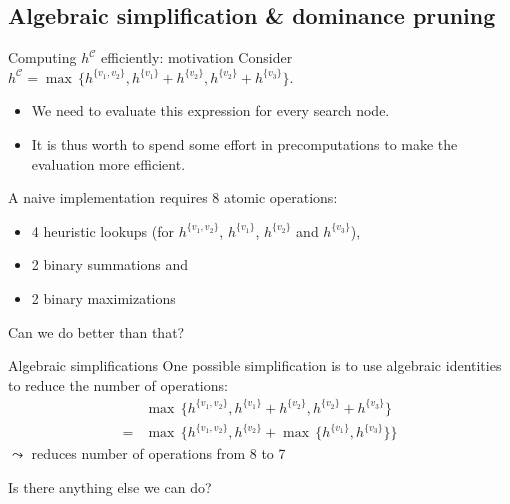 \documentclass{gkibeamer}
\begin{document}
\subsection[Simplification]{Algebraic simplification \& dominance pruning}

\begin{frame}{Computing $h^{\mathcal C}$ efficiently: motivation}
  Consider $h^{\mathcal C} = \max\,\{
    h^{\{v_1, v_2\}},
    h^{\{v_1\}} + h^{\{v_2\}},
    h^{\{v_2\}} + h^{\{v_3\}}
    \}$.
  \begin{itemize}
  \item We need to evaluate this expression for \alert{every search
    node}.
  \item It is thus worth to spend some effort in precomputations to
    make the evaluation \alert{more efficient}.
  \end{itemize}

  \medskip

  A naive implementation requires \alert{8 atomic operations}:
  \begin{itemize}
  \item \alert{4} heuristic lookups (for
    $h^{\{v_1, v_2\}}$, 
    $h^{\{v_1\}}$, 
    $h^{\{v_2\}}$ and
    $h^{\{v_3\}}$),
  \item \alert{2} binary summations and
  \item \alert{2} binary maximizations
  \end{itemize}

  \medskip

  \alert{Can we do better than that?}
\end{frame}

\begin{frame}{Algebraic simplifications}
  One possible simplification is to use \alert{algebraic
    identities} \\
  to reduce the number of operations:
  \begin{align*}
    &
    \max\,\{
      h^{\{v_1, v_2\}},
      h^{\{v_1\}} + h^{\{v_2\}},
      h^{\{v_2\}} + h^{\{v_3\}}
      \} \\
    {} = {} &
    \max\,\{
      h^{\{v_1, v_2\}},
      h^{\{v_2\}} + \max\,\{h^{\{v_1\}}, h^{\{v_3\}}\}
      \}
  \end{align*}
  $\leadsto$ reduces number of operations from \alert{8} to \alert{7}

  \medskip

  \alert{Is there anything else we can do?}
\end{frame}
\end{document}
